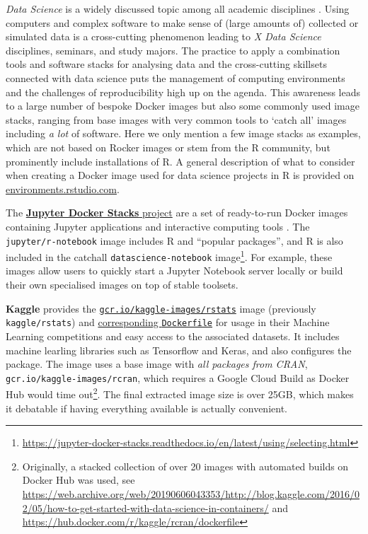 \emph{Data Science} is a widely discussed topic among all academic
disciplines \citep[cf. e.g.,][]{donoho_50_2017}. Using computers and
complex software to make sense of (large amounts of) collected or
simulated data is a cross-cutting phenomenon leading to \emph{X Data
Science} disciplines, seminars, and study majors. The practice to apply
a combination tools and software stacks for analysing data and the
cross-cutting skillsets connected with data science puts the management
of computing environments and the challenges of reproducibility high up
on the agenda. This awareness leads to a large number of bespoke Docker
images but also some commonly used image stacks, ranging from base
images with very common tools to `catch all' images including \emph{a
lot} of software. Here we only mention a few image stacks as examples,
which are not based on Rocker images or stem from the R community, but
prominently include installations of R. A general description of what to
consider when creating a Docker image used for data science projects in
R is provided on
\href{https://environments.rstudio.com/docker}{environments.rstudio.com}.

The \href{https://github.com/jupyter/docker-stacks/}{\textbf{Jupyter
Docker Stacks} project} are a set of ready-to-run Docker images
containing Jupyter applications and interactive computing tools
\citep{project_jupyter_jupyter_2018}. The \texttt{jupyter/r-notebook}
image includes R and ``popular packages'', and R is also included in the
catchall \texttt{datascience-notebook}
image\footnote{\href{https://jupyter-docker-stacks.readthedocs.io/en/latest/using/selecting.html}{https://jupyter-docker-stacks.readthedocs.io/en/latest/using/selecting.html}}.
For example, these images allow users to quickly start a Jupyter
Notebook server locally or build their own specialised images on top of
stable toolsets.

\textbf{Kaggle} provides the
\href{https://hub.docker.com/r/kaggle/rstats}{\texttt{gcr.io/kaggle-images/rstats}}
image (previously \texttt{kaggle/rstats}) and
\href{https://github.com/Kaggle/docker-rstats}{corresponding
\texttt{Dockerfile}} for usage in their Machine Learning competitions
and easy access to the associated datasets. It includes machine learling
libraries such as Tensorflow and Keras, and also configures the
 package. The image uses a base image with \emph{all
packages from CRAN}, \texttt{gcr.io/kaggle-images/rcran}, which requires
a Google Cloud Build as Docker Hub would time
out\footnote{Originally, a stacked collection of over 20 images with automated builds on Docker Hub was used, see \href{https://web.archive.org/web/20190606043353/http://blog.kaggle.com/2016/02/05/how-to-get-started-with-data-science-in-containers/}{https://web.archive.org/web/20190606043353/http://blog.kaggle.com/2016/02/05/how-to-get-started-with-data-science-in-containers/} and \href{https://hub.docker.com/r/kaggle/rcran/dockerfile}{https://hub.docker.com/r/kaggle/rcran/dockerfile}}.
The final extracted image size is over 25GB, which makes it debatable if
having everything available is actually convenient.

